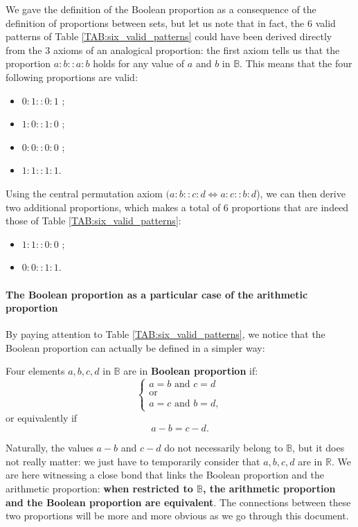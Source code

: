 We gave the definition of the Boolean proportion as a consequence of the
definition of proportions between sets, but let us note that in fact, the $6$
valid patterns of Table \ref{TAB:six_valid_patterns} could have been derived
directly from the $3$ axioms of an analogical proportion: the first axiom tells
us that the proportion $a:b::a:b$ holds for any value of $a$ and $b$ in
$\mathbb{B}$. This means that the four following proportions are valid:
\begin{itemize}
  \item $0 : 1 :: 0 :1$ ;
  \item $1 : 0 :: 1 :0$ ;
  \item $0 : 0 :: 0 :0$ ;
  \item $1 : 1 :: 1 :1$.
\end{itemize}
Using the central permutation axiom $(a:b::c:d \iff a:c::b:d$), we can then
derive two additional proportions, which makes a total of $6$ proportions that
are indeed those of Table \ref{TAB:six_valid_patterns}:
\begin{itemize}
  \item $1 : 1 :: 0 : 0$ ;
  \item $0 : 0 :: 1 : 1$.
\end{itemize}

\paragraph{The Boolean proportion as a particular case of the arithmetic
proportion\\}

By paying attention to Table \ref{TAB:six_valid_patterns}, we notice that the
Boolean proportion can actually be defined in a simpler way:
\begin{definition}
  \label{DEF:boolean_proportion_informal}
  Four elements $a, b, c, d$ in $\mathbb{B}$ are in \textbf{Boolean proportion} if:
  $$
  \begin{cases}
    a = b \text{ and } c = d\\
    \text{or}\\
    a = c \text{ and } b = d,
  \end{cases}
  $$
  or equivalently if
  $$a - b = c - d.$$
\end{definition}

Naturally, the values $a - b$ and $c -d$ do not necessarily belong to
$\mathbb{B}$, but it does not really matter: we just have to temporarily
consider that $a, b, c, d$ are in $\mathbb{R}$. We are here witnessing a close
bond that links the Boolean proportion and the arithmetic proportion:
\textbf{when restricted to $\mathbb{B}$, the arithmetic proportion and the
Boolean proportion are equivalent}. The connections between these two
proportions will be more and more obvious as we go through this document.

